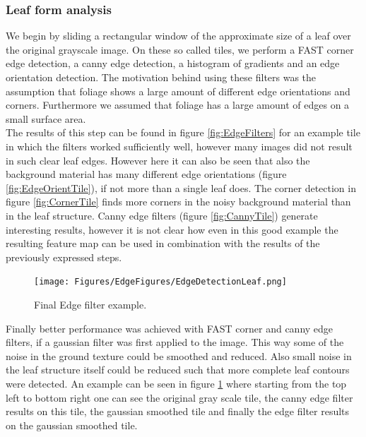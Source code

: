 \documentclass[fleqn,10pt]{SelfArx} %
\begin{document}
\subsubsection{Leaf form analysis}

We begin by sliding a rectangular window of the approximate size of a leaf over the original grayscale image. On these so called tiles, we perform a FAST corner edge detection, a canny edge detection, a histogram of gradients and an edge orientation detection. The motivation behind using these filters was the assumption that foliage shows a large amount of different edge orientations and corners. Furthermore we assumed that foliage has a large amount of edges on a small surface area. \\
The results of this step can be found in figure \ref{fig:EdgeFilters} for an example tile in which the filters worked sufficiently well, however many images did not result in such clear leaf edges. However here it can also be seen that also the background material has many different edge orientations (figure \ref{fig:EdgeOrientTile}), if not more than a single leaf does. The corner detection in figure \ref{fig:CornerTile} finds more corners in the noisy background material than in the leaf structure. Canny edge filters (figure \ref{fig:CannyTile}) generate interesting results, however it is not clear how even in this good example the resulting feature map can be used in combination with the results of the previously expressed steps.\\
\begin{figure}[ht]\centering
\texttt{[image: Figures/EdgeFigures/EdgeDetectionLeaf.png]}
\caption{Final Edge filter example.}
\label{fig:ExEdgeDet}
\end{figure}
Finally better performance was achieved with FAST corner and canny edge filters, if a gaussian filter was first applied to the image. This way some of the noise in the ground texture could be smoothed and reduced. Also small noise in the leaf structure itself could be reduced such that more complete leaf contours were detected. An example can be seen in figure \ref{fig:ExEdgeDet} where starting from the top left to bottom right one can see the original gray scale tile, the canny edge filter results on this tile, the gaussian smoothed tile and finally the edge filter results on the gaussian smoothed tile. 

\end{document}
